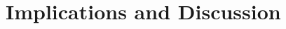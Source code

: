 \documentclass[usenatbib,fleqn]{mn2e}
\newcommand\lsim{\mathrel{\rlap{\lower4pt\hbox{\hskip1pt$\sim$}}
    \raise1pt\hbox{$<$}}}
\newcommand{\rs}{r_s}
\newcommand{\Mbh}[1][]{M_{\bullet#1}}
\newcommand{\rIa}{r_{\rm Ia}}
\newcommand{\vwO}{v_{w}}
\newcommand{\tage}{t_{\star}}
\begin{document}








\section{Implications and Discussion}
\label{sec:discussion}
\end{document}
